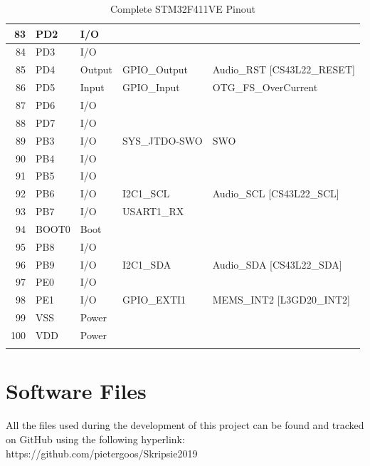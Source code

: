\documentclass[12pt,a4paper]{report}
\begin{document}
\begin{longtable}[c]{|r|l|l|r|r|}
		\hline
		83    & PD2   & I/O   &       &  \\
		\hline
		84    & PD3   & I/O   &       &  \\
		\hline
		85    & PD4   & Output & \multicolumn{1}{l|}{GPIO\_Output} & \multicolumn{1}{l|}{Audio\_RST [CS43L22\_RESET]} \\
		\hline
		86    & PD5   & Input & \multicolumn{1}{l|}{GPIO\_Input} & \multicolumn{1}{l|}{OTG\_FS\_OverCurrent} \\
		\hline
		87    & PD6   & I/O   &       &  \\
		\hline
		88    & PD7   & I/O   &       &  \\
		\hline
		89    & PB3   & I/O   & \multicolumn{1}{l|}{SYS\_JTDO-SWO} & \multicolumn{1}{l|}{SWO} \\
		\hline
		90    & PB4   & I/O   &       &  \\
		\hline
		91    & PB5   & I/O   &       &  \\
		\hline
		92    & PB6   & I/O   & \multicolumn{1}{l|}{I2C1\_SCL} & \multicolumn{1}{l|}{Audio\_SCL [CS43L22\_SCL]} \\
		\hline
		93    & PB7   & I/O   & \multicolumn{1}{l|}{USART1\_RX} &  \\
		\hline
		94    & BOOT0 & Boot  &       &  \\
		\hline
		95    & PB8   & I/O   &       &  \\
		\hline
		96    & PB9   & I/O   & \multicolumn{1}{l|}{I2C1\_SDA} & \multicolumn{1}{l|}{Audio\_SDA [CS43L22\_SDA]} \\
		\hline
		97    & PE0   & I/O   &       &  \\
		\hline
		98    & PE1   & I/O   & \multicolumn{1}{l|}{GPIO\_EXTI1} & \multicolumn{1}{l|}{MEMS\_INT2 [L3GD20\_INT2]} \\
		\hline
		99    & VSS   & Power &       &  \\
		\hline
		100   & VDD   & Power &       &  \\
		\hline
		
		\caption{Complete STM32F411VE Pinout \cite{f411}}
		\label{tab:stmPinout}
\end{longtable}
\normalsize
\newpage
\chapter{Software Files}
All the files used during the development of this project can be found and tracked on GitHub using the following hyperlink:\\
https://github.com/pietergoos/Skripsie2019
\end{document}
